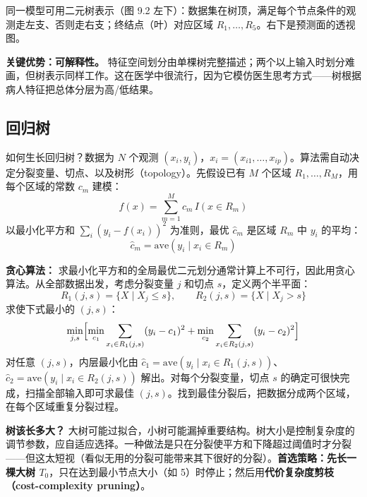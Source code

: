 同一模型可用二元树表示（图 9.2 左下）：数据集在树顶，满足每个节点条件的观测走左支、否则走右支；终结点（叶）对应区域 $R_1, \ldots, R_5$。右下是预测面的透视图。

\textbf{关键优势：可解释性。} 特征空间划分由单棵树完整描述；两个以上输入时划分难画，但树表示同样工作。这在医学中很流行，因为它模仿医生思考方式——树根据病人特征把总体分层为高/低结果。

\subsection{回归树}

如何生长回归树？数据为 $N$ 个观测 $(x_i, y_i)$，$x_i = (x_{i1}, \ldots, x_{ip})$。算法需自动决定分裂变量、切点、以及树形（topology）。先假设已有 $M$ 个区域 $R_1, \ldots, R_M$，用每个区域的常数 $c_m$ 建模：
\begin{equation}\label{eq:9_10}
    f(x) = \sum_{m=1}^{M} c_m\, I(x \in R_m)
\end{equation}
以最小化平方和 $\sum_i (y_i - f(x_i))^2$ 为准则，最优 $\hat c_m$ 是区域 $R_m$ 中 $y_i$ 的平均：
\begin{equation}\label{eq:9_11}
    \hat c_m = \mathrm{ave}(y_i \mid x_i \in R_m)
\end{equation}

\textbf{贪心算法：} 求最小化平方和的全局最优二元划分通常计算上不可行，因此用贪心算法。从全部数据出发，考虑分裂变量 $j$ 和切点 $s$，定义两个半平面：
\begin{equation}\label{eq:9_12}
    R_1(j,s) = \{X \mid X_j \le s\},\qquad R_2(j,s) = \{X \mid X_j > s\}
\end{equation}
求使下式最小的 $(j, s)$：
\begin{equation}\label{eq:9_13}
    \min_{j,s}\Bigl[\min_{c_1}\sum_{x_i \in R_1(j,s)}(y_i - c_1)^2 + \min_{c_2}\sum_{x_i \in R_2(j,s)}(y_i - c_2)^2\Bigr]
\end{equation}
对任意 $(j,s)$，内层最小化由 $\hat c_1 = \mathrm{ave}(y_i \mid x_i \in R_1(j,s))$、$\hat c_2 = \mathrm{ave}(y_i \mid x_i \in R_2(j,s))$ 解出。对每个分裂变量，切点 $s$ 的确定可很快完成，扫描全部输入即可求最佳 $(j,s)$。找到最佳分裂后，把数据分成两个区域，在每个区域重复分裂过程。

\textbf{树该长多大？} 大树可能过拟合，小树可能漏掉重要结构。树大小是控制复杂度的调节参数，应自适应选择。一种做法是只在分裂使平方和下降超过阈值时才分裂——但这太短视（看似无用的分裂可能带来其下很好的分裂）。\textbf{首选策略：先长一棵大树 $T_0$}，只在达到最小节点大小（如 5）时停止；然后用\textbf{代价复杂度剪枝（cost-complexity pruning）}。

